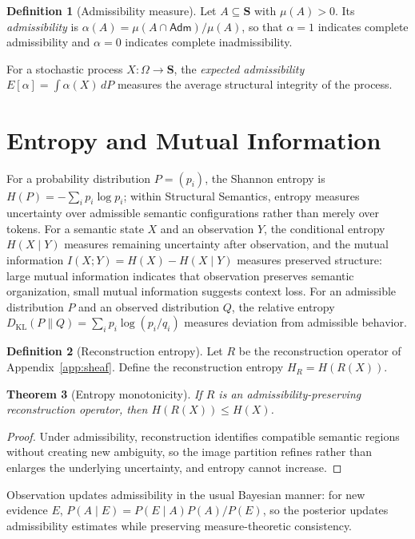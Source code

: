 \documentclass[11pt,twoside,openright]{book}
\numberwithin{equation}{chapter}
\theoremstyle{definition}
\newtheorem{definition}{Definition}[chapter]
\theoremstyle{plain}
\newtheorem{theorem}[definition]{Theorem}
\theoremstyle{remark}
\theoremstyle{definition}
\newcommand{\Scope}{\mathbf{S}}
\begin{document}
\begin{definition}[Admissibility measure]
Let $A\subseteq\Scope$ with $\mu(A)>0$. Its \emph{admissibility} is
$\alpha(A)=\mu(A\cap\mathsf{Adm})/\mu(A)$, so that $\alpha=1$ indicates
complete admissibility and $\alpha=0$ indicates complete inadmissibility.
\end{definition}

For a stochastic process $X:\Omega\to\Scope$, the \emph{expected
admissibility} $E[\alpha]=\int\alpha(X)\,dP$ measures the average
structural integrity of the process.

\section{Entropy and Mutual Information}

For a probability distribution $P=(p_i)$, the Shannon entropy is
$H(P)=-\sum_i p_i\log p_i$; within Structural Semantics, entropy measures
uncertainty over admissible semantic configurations rather than merely
over tokens. For a semantic state $X$ and an observation $Y$, the
conditional entropy $H(X\mid Y)$ measures remaining uncertainty after
observation, and the mutual information $I(X;Y)=H(X)-H(X\mid Y)$ measures
preserved structure: large mutual information indicates that observation
preserves semantic organization, small mutual information suggests
context loss. For an admissible distribution $P$ and an observed
distribution $Q$, the relative entropy
$D_{\mathrm{KL}}(P\|Q)=\sum_i p_i\log(p_i/q_i)$ measures deviation from
admissible behavior.

\begin{definition}[Reconstruction entropy]
Let $R$ be the reconstruction operator of Appendix~\ref{app:sheaf}.
Define the reconstruction entropy $H_R=H(R(X))$.
\end{definition}

\begin{theorem}[Entropy monotonicity]
If $R$ is an admissibility-preserving reconstruction operator, then
$H(R(X))\le H(X)$.
\end{theorem}

\begin{proof}
Under admissibility, reconstruction identifies compatible semantic
regions without creating new ambiguity, so the image partition refines
rather than enlarges the underlying uncertainty, and entropy cannot
increase.
\end{proof}

Observation updates admissibility in the usual Bayesian manner: for new
evidence $E$, $P(A\mid E)=P(E\mid A)P(A)/P(E)$, so the posterior updates
admissibility estimates while preserving measure-theoretic consistency.
\end{document}
